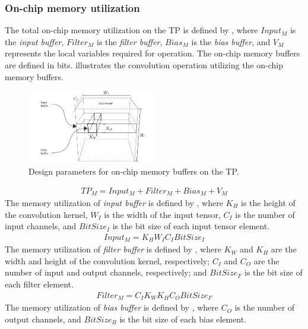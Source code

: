 \subsubsection{\textbf{On-chip memory utilization}}
The total on-chip memory utilization on the TP is defined by , where $Input_{M}$ is the \emph{input buffer}, $Filter_{M}$ is the \emph{filter buffer}, $Bias_{M}$ is the \emph{bias buffer}, and $V_{M}$ represents the local variables required for operation. The on-chip memory buffers are defined in bits.  illustrates the convolution operation utilizing the on-chip memory buffers.
\begin{figure}[h!]
	\centering
	\includegraphics[width=0.5\textwidth]{../figures/accelerator_buffers.pdf}
	\caption{Design parameters for on-chip memory buffers on the TP.}
	\label{fig:accelerator_buffers}
\end{figure}
\begin{eqnarray} \label{eq:tp_memory}
TP_{M}=Input_{M}+Filter_{M}+Bias_{M}+V_{M}
\end{eqnarray}
The memory utilization of \emph{input buffer} is defined by , where $K_{H}$ is the height of the convolution kernel, $W_{I}$ is the width of the input tensor, $C_{I}$ is the number of input channels, and $BitSize_{I}$ is the bit size of each input tensor element.
\begin{eqnarray} \label{eq:input_memory}
Input_{M}=K_{H}W_{I}C_{I}BitSize_{I}
\end{eqnarray}
The memory utilization of \emph{filter buffer} is defined by , where $K_{W}$ and $K_{H}$ are the width and height of the convolution kernel, respectively; $C_{I}$ and $C_{O}$ are the number of input and output channels, respectively; and $BitSize_{F}$ is the bit size of each filter element.
\begin{eqnarray} \label{eq:filter_memory}
Filter_{M}=C_{I}K_{W}K_{H}C_{O}BitSize_{F}
\end{eqnarray}
The memory utilization of \emph{bias buffer} is defined by , where $C_{O}$ is the number of output channels, and $BitSize_{B}$ is the bit size of each bias element.
